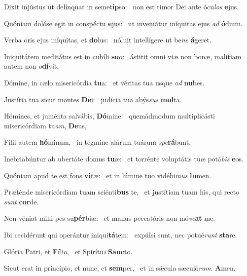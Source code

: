 \item Dixit injústus ut delínquat in semet\textbf{íp}so:~\psstar{} non est timor Dei ante ócu\textit{los} \textbf{e}jus.
\item Quóniam dolóse egit in conspéctu \textbf{e}jus:~\psstar{} ut inveniátur iníquitas ejus \textit{ad} \textbf{ó}dium.
\item Verba oris ejus iníquitas, et \textbf{do}lus:~\psstar{} nóluit intellígere ut be\textit{ne} \textbf{á}geret.
\item Iniquitátem meditátus est in cubíli \textbf{su}o:~\psstar{} ástitit omni viæ non bonæ, malítiam autem non \textit{o}\textbf{dí}vit.
\item Dómine, in cælo misericórdia \textbf{tu}a:~\psstar{} et véritas tua usque \textit{ad} \textbf{nu}bes.
\item Justítia tua sicut montes \textbf{De}i:~\psstar{} judícia tua abýs\textit{sus} \textbf{mul}ta.
\item Hómines, et juménta salvábis, \textbf{Dó}mine:~\psstar{} quemádmodum multiplicásti misericórdiam tu\textit{am}, \textbf{De}us,
\item Fílii autem \textbf{hó}minum,~\psstar{} in tégmine alárum tuárum \textit{spe}\textbf{rá}bunt.
\item Inebriabúntur ab ubertáte domus \textbf{tu}æ:~\psstar{} et torrénte voluptátis tuæ potá\textit{bis} \textbf{e}os.
\item Quóniam apud te est fons \textbf{vi}tæ:~\psstar{} et in lúmine tuo vidébi\textit{mus} \textbf{lu}men.
\item Præténde misericórdiam tuam sciénti\textbf{bus} te,~\psstar{} et justítiam tuam his, qui recto \textit{sunt} \textbf{cor}de.
\item Non véniat mihi pes su\textbf{pér}biæ:~\psstar{} et manus peccatóris non mó\textit{ve}\textbf{at} me.
\item Ibi cecidérunt qui operántur iniqui\textbf{tá}tem:~\psstar{} expúlsi sunt, nec potué\textit{runt} \textbf{sta}re.
\item Glória Patri, et \textbf{Fí}lio,~\psstar{} et Spirítu\textit{i} \textbf{Sanc}to.
\item Sicut erat in princípio, et nunc, et \textbf{sem}per,~\psstar{} et in sǽcula sæculó\textit{rum}. \textbf{A}men.